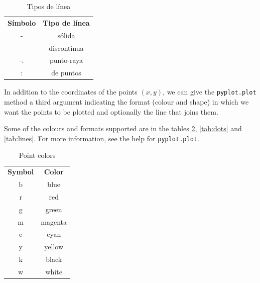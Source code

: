 \begin{paracol}{2}
      \begin{table}
        \centering
        \begin{tabular}{|c|c|} \hline
        \textbf{Símbolo}     &  \textbf{Tipo de línea}\\
             -& sólida \\ \hline
             --& discontínua\\ \hline
             -.& punto-raya \\ \hline
             :& de puntos\\ \hline
        \end{tabular}
        \caption{Tipos de línea}
        \label{tab:lineas}
    \end{table}  
    \switchcolumn
    In addition to the coordinates of the points $(x,y)$, we can give the \texttt{pyplot.plot} method a third argument indicating the format (colour and shape) in which we want the points to be plotted and optionally the line that joins them. 

    Some of the colours and formats supported are in the tables \ref{tab:colours}, \ref{tab:dots} and \ref{tab:lines}. For more information, see the help for \texttt{pyplot.plot}.
    
    \begin{table}
        \centering
        \begin{tabular}{|c|c|} \hline
        \textbf{Symbol}     &  \textbf{Color}\\
             b& blue \\ \hline
             r& red \\ \hline
             g& green \\ \hline
             m& magenta\\ \hline
             c& cyan\\ \hline
             y& yellow\\ \hline
             k& black\\ \hline
             w& white\\ \hline
        \end{tabular}
        \caption{Point colors}
        \label{tab:colours}
    \end{table}


\end{paracol}
